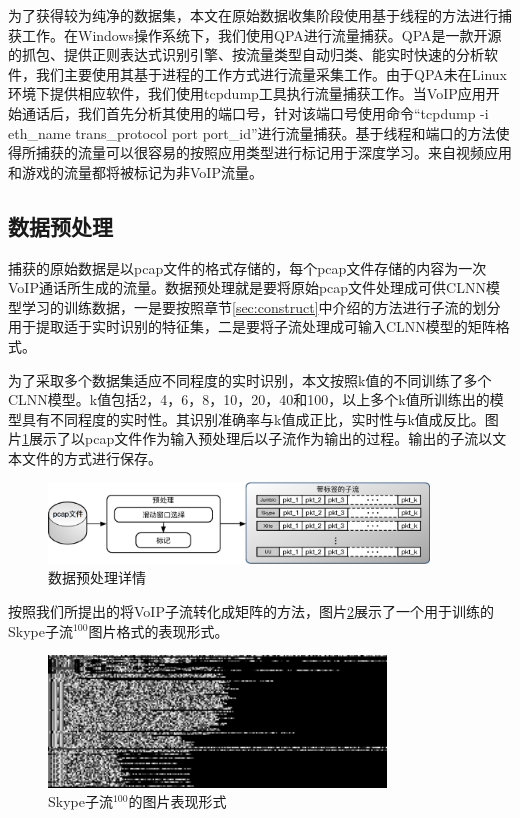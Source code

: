 为了获得较为纯净的数据集，本文在原始数据收集阶段使用基于线程的方法进行捕获工作。在Windows操作系统下，我们使用QPA进行流量捕获。QPA是一款开源的抓包、提供正则表达式识别引擎、按流量类型自动归类、能实时快速的分析软件，我们主要使用其基于进程的工作方式进行流量采集工作。由于QPA未在Linux环境下提供相应软件，我们使用tcpdump工具执行流量捕获工作。当VoIP应用开始通话后，我们首先分析其使用的端口号，针对该端口号使用命令“tcpdump -i eth\_name trans\_protocol port port\_id”进行流量捕获。基于线程和端口的方法使得所捕获的流量可以很容易的按照应用类型进行标记用于深度学习。来自视频应用和游戏的流量都将被标记为非VoIP流量。


\subsection{数据预处理}
捕获的原始数据是以pcap文件的格式存储的，每个pcap文件存储的内容为一次VoIP通话所生成的流量。数据预处理就是要将原始pcap文件处理成可供CLNN模型学习的训练数据，一是要按照章节\ref{sec:construct}中介绍的方法进行子流的划分用于提取适于实时识别的特征集，二是要将子流处理成可输入CLNN模型的矩阵格式。

为了采取多个数据集适应不同程度的实时识别，本文按照k值的不同训练了多个CLNN模型。k值包括2，4，6，8，10，20，40和100，以上多个k值所训练出的模型具有不同程度的实时性。其识别准确率与k值成正比，实时性与k值成反比。图片\ref{fig:datasetprocessing}展示了以pcap文件作为输入预处理后以子流作为输出的过程。输出的子流以文本文件的方式进行保存。

\begin{figure}[htp]
\begin{center}
\includegraphics[width=0.9\textwidth]{figures/datasetprocessing.eps}
\caption{数据预处理详情}\label{fig:datasetprocessing}
\end{center}
\end{figure}



按照我们所提出的将VoIP子流转化成矩阵的方法，图片\ref{fig:skype1}展示了一个用于训练的Skype子流$^{100}$图片格式的表现形式。

\begin{figure}[htp]
\begin{center}
\includegraphics[width=0.8\textwidth]{figures/skype1.png}
\caption{Skype子流$^{100}$的图片表现形式}\label{fig:skype1}
\end{center}
\end{figure}

